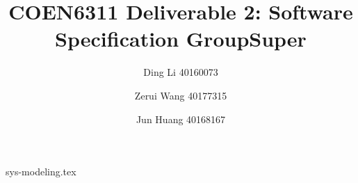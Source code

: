 \documentclass[sigconf, nonacm, acmsmall]{../tex_template/acmart}
\begin{document}
\title{COEN6311 Deliverable 2: Software Specification GroupSuper}

\author{Ding Li 40160073}
\author{Zerui Wang 40177315}
\author{Jun Huang 40168167}

\maketitle

{sys-modeling.tex}
\end{document}
